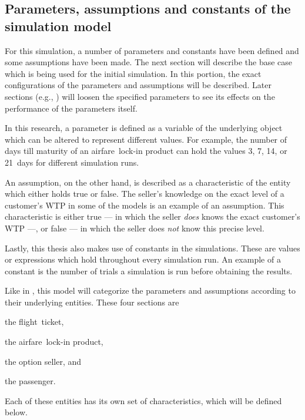 






\subsection{Parameters, assumptions and constants of the simulation model}
For this simulation, a number of parameters and constants have been defined and some assumptions have been made. The next section will describe the base case which is being used for the initial simulation. In this portion, the exact configurations of the parameters and assumptions will be described. Later sections (e.g., ) will loosen the specified parameters to see its effects on the performance of the parameters itself.

In this research, a parameter is defined as a variable of the underlying object which can be altered to represent different values. For example, the number of days till maturity of an airfare~lock-in product can hold the values 3, 7, 14, or 21~days for different simulation runs.

An assumption, on the other hand, is described as a characteristic of the entity which either holds true or false. The seller's knowledge on the exact level of a customer's WTP in some of the models is an example of an assumption. This characteristic is either true --- in which the seller \emph{does} knows the exact customer's WTP ---, or false --- in which the seller does \emph{not} know this precise level.

Lastly, this thesis also makes use of constants in the simulations. These are values or expressions which hold throughout every simulation run. An example of a constant is the number of trials a simulation is run before obtaining the results.

Like in , this model will categorize the parameters and assumptions according to their underlying entities. These four sections are \begin{inparaenum}
\item the flight~ticket,
\item the airfare~lock-in product,
\item the option seller, and
\item the passenger.
\end{inparaenum} Each of these entities has its own set of characteristics, which will be defined below.

